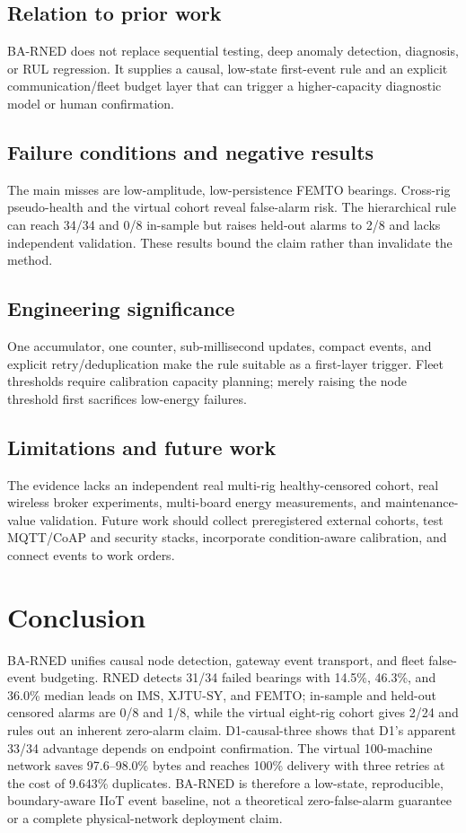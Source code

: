 \documentclass[journal]{IEEEtran}
\begin{document}
\subsection{Relation to prior work}
BA-RNED does not replace sequential testing, deep anomaly detection, diagnosis, or RUL regression. It supplies a causal, low-state first-event rule and an explicit communication/fleet budget layer that can trigger a higher-capacity diagnostic model or human confirmation.

\subsection{Failure conditions and negative results}
The main misses are low-amplitude, low-persistence FEMTO bearings. Cross-rig pseudo-health and the virtual cohort reveal false-alarm risk. The hierarchical rule can reach 34/34 and 0/8 in-sample but raises held-out alarms to 2/8 and lacks independent validation. These results bound the claim rather than invalidate the method.

\subsection{Engineering significance}
One accumulator, one counter, sub-millisecond updates, compact events, and explicit retry/deduplication make the rule suitable as a first-layer trigger. Fleet thresholds require calibration capacity planning; merely raising the node threshold first sacrifices low-energy failures.

\subsection{Limitations and future work}
The evidence lacks an independent real multi-rig healthy-censored cohort, real wireless broker experiments, multi-board energy measurements, and maintenance-value validation. Future work should collect preregistered external cohorts, test MQTT/CoAP and security stacks, incorporate condition-aware calibration, and connect events to work orders.

\section{Conclusion}\label{sec:conclusion}
BA-RNED unifies causal node detection, gateway event transport, and fleet false-event budgeting. RNED detects 31/34 failed bearings with 14.5\%, 46.3\%, and 36.0\% median leads on IMS, XJTU-SY, and FEMTO; in-sample and held-out censored alarms are 0/8 and 1/8, while the virtual eight-rig cohort gives 2/24 and rules out an inherent zero-alarm claim. D1-causal-three shows that D1's apparent 33/34 advantage depends on endpoint confirmation. The virtual 100-machine network saves 97.6--98.0\% bytes and reaches 100\% delivery with three retries at the cost of 9.643\% duplicates. BA-RNED is therefore a low-state, reproducible, boundary-aware IIoT event baseline, not a theoretical zero-false-alarm guarantee or a complete physical-network deployment claim.
\end{document}
